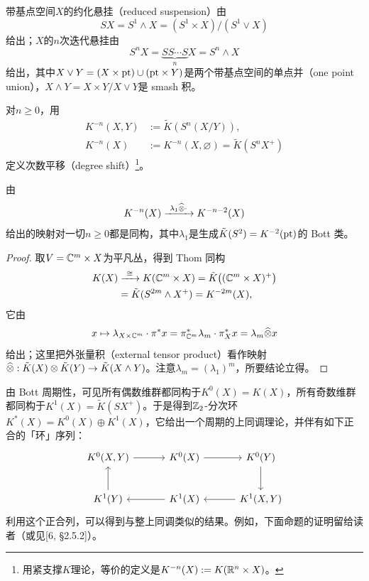 \begin{definition}
带基点空间$X$的约化悬挂（reduced suspension）由
\[
SX=S^1\wedge X=(S^1\times X)/(S^1\vee X)
\]
给出；$X$的$n$次迭代悬挂由
\[
S^nX=\underbrace{SS\cdots S}_{n}X=S^n\wedge X
\]
给出，其中$X\vee Y=(X\times\mathrm{pt})\cup(\mathrm{pt}\times Y)$是两个带基点空间的单点并（one point union），$X\wedge Y=X\times Y/X\vee Y$是 smash 积。
\end{definition}

\begin{definition}
对$n\ge 0$，用
\begin{align*}
K^{-n}(X,Y)&:=\tilde K(S^n(X/Y)),\\
K^{-n}(X)&:=K^{-n}(X,\varnothing)=\tilde K(S^nX^+)
\end{align*}
定义次数平移（degree shift）\footnote{用紧支撑$K$理论，等价的定义是$K^{-n}(X):=K(\mathbb{R}^n\times X)$。}。
\end{definition}

\begin{corollary}
由
\[
K^{-n}(X)\xrightarrow{\ \lambda_1\BT\cdot\ }K^{-n-2}(X)
\]
给出的映射对一切$n\ge 0$都是同构，其中$\lambda_1$是生成$\tilde K(S^2)=K^{-2}(\mathrm{pt})$的 Bott 类。
\end{corollary}

\begin{proof}
取$V=\mathbb{C}^m\times X$为平凡丛，得到 Thom 同构
\begin{align*}
K(X)&\xrightarrow{\ \cong\ }K(\mathbb{C}^m\times X)=\tilde K\big((\mathbb{C}^m\times X)^+\big)\\
&=\tilde K(S^{2m}\wedge X^+)=K^{-2m}(X),
\end{align*}
它由
\[
x\mapsto\lambda_{X\times\mathbb{C}^m}\cdot\pi^*x=\pi^*_{\mathbb{C}^m}\lambda_m\cdot\pi^*_Xx=\lambda_m\widehat{\otimes} x
\]
给出；这里把外张量积（external tensor product）看作映射$\widehat{\otimes}:\tilde K(X)\otimes\tilde K(Y)\to\tilde K(X\wedge Y)$。注意$\lambda_m=(\lambda_1)^m$，所要结论立得。
\end{proof}


由 Bott 周期性，可见所有偶数维群都同构于$K^0(X)=K(X)$，所有奇数维群都同构于$K^1(X)=\tilde K(SX^+)$。于是得到$\mathbb{Z}_2$-分次环$K^*(X)=K^0(X)\oplus K^1(X)$，它给出一个周期的上同调理论，并伴有如下正合的「环」序列：
\[
\begin{tikzcd}[column sep=3.2em,row sep=2.4em]
K^0(X,Y)\arrow[r] & K^0(X)\arrow[r] & K^0(Y)\arrow[d]\\
K^1(Y)\arrow[u] & K^1(X)\arrow[l] & K^1(X,Y)\arrow[l]
\end{tikzcd}
\]
利用这个正合列，可以得到与整上同调类似的结果。例如，下面命题的证明留给读者（或见[6, §2.5.2]）。

